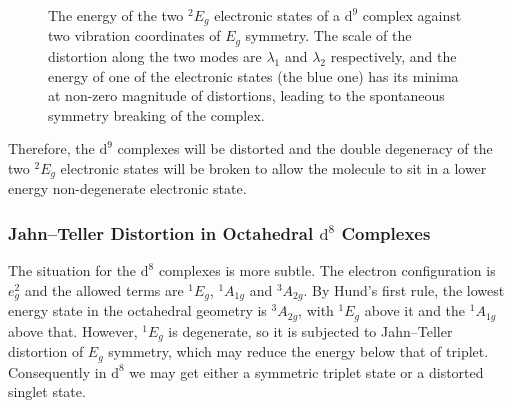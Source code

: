 \documentclass{article}
\theoremstyle{plain}\theoremheaderfont{\normalfont\itshape}\theorembodyfont{\rmfamily}\theoremseparator{.}\newtheorem*{rem}{Remark}\newtheorem*{ex}{Example}\newtheorem*{proof}{Proof}\newtheorem*{altp}{Alternative proof}
\theoremstyle{plain}\theoremheaderfont{\normalfont\bfseries}\theorembodyfont{\rmfamily}\theoremseparator{.}\newtheorem{thm}{Theorem}[section]\newtheorem{lem}[thm]{Lemma}\newtheorem{prop}[thm]{Proposition}\newtheorem*{cor}{Corollary}\newtheorem{defn}[thm]{Definition}\newtheorem{clm}[thm]{Claim}\newtheorem{clminproof}{Claim}\newtheorem*{law}{Law}\newtheorem{pos}[thm]{Postulate}
\theoremstyle{break}\theoremheaderfont{\normalfont\itshape}\theorembodyfont{\rmfamily}\theoremseparator{.\medskip}\newtheorem*{proofskip}{Proof}\newtheorem*{exs}{Examples}\newtheorem*{rems}{Remarks}
\theoremstyle{break}\theoremheaderfont{\normalfont\bfseries}\theorembodyfont{\rmfamily}\theoremseparator{.\medskip}\newtheorem{lemskip}[thm]{Lemma}\newtheorem{defnskip}[thm]{Definition}\newtheorem{propskip}[thm]{Proposition}\newtheorem{thmskip}[thm]{Theorem}
\numberwithin{equation}{section}
\begin{document}
    \begin{figure}
        \centering
        \caption{The energy of the two \(^2E_g\) electronic states of a \(\mathrm{d}^9\) complex against two vibration coordinates of \(E_g\) symmetry. The scale of the distortion along the two modes are \(\lambda_1\) and \(\lambda_2\) respectively, and the energy of one of the electronic states (the blue one) has its minima at non-zero magnitude of distortions, leading to the spontaneous symmetry breaking of the complex.}
    \end{figure}

    Therefore, the \(\mathrm{d}^9\) complexes will be distorted and the double degeneracy of the two \(^2E_g\) electronic states will be broken to allow the molecule to sit in a lower energy non-degenerate electronic state. 

    \subsubsection{Jahn--Teller Distortion in Octahedral \texorpdfstring{\(\mathrm{d}^8\)}{d8} Complexes}
    The situation for the \(\mathrm{d}^8\) complexes is more subtle. The electron configuration is \(e_g^2\) and the allowed terms are \(^1E_g\), \(^1A_{1g}\) and \(^3 A_{2g}\). By Hund's first rule, the lowest energy state in the octahedral geometry is \(^3A_{2g}\), with \(^1E_g\) above it and the \(^1A_{1g}\) above that. However, \(^1E_g\) is degenerate, so it is subjected to Jahn--Teller distortion of \(E_g\) symmetry, which may reduce the energy below that of triplet. Consequently in \(\mathrm{d}^8\) we may get either a symmetric triplet state or a distorted singlet state.
\end{document}

